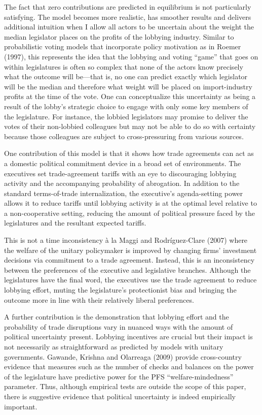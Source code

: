 \documentclass[10pt]{article}
\begin{document}
The fact that zero contributions are predicted in equilibrium is not particularly satisfying. The model becomes more realistic, has smoother results and delivers additional intuition when I allow all actors to be uncertain about the weight the median legislator places on the profits of the lobbying industry. Similar to probabilistic voting models that incorporate policy motivation as in Roemer (1997), this represents the idea that the lobbying and voting ``game'' that goes on within legislatures is often so complex that none of the actors know precisely what the outcome will be---that is, no one can predict exactly which legislator will be the median and therefore what weight will be placed on import-industry profits at the time of the vote. One can conceptualize this uncertainty as being a result of the lobby's strategic choice to engage with only some key members of the legislature. For instance, the lobbied legislators may promise to deliver the votes of their non-lobbied colleagues but may not be able to do so with certainty because those colleagues are subject to cross-pressuring from various sources.

One contribution of this model is that it shows how trade agreements can act as a domestic political commitment device in a broad set of environments. The executives set trade-agreement tariffs with an eye to discouraging lobbying activity and the accompanying probability of abrogation. In addition to the standard terms-of-trade internalization, the executive's agenda-setting power allows it to reduce tariffs until lobbying activity is at the optimal level relative to a non-cooperative setting, reducing the amount of political pressure faced by the legislatures and the resultant expected tariffs.

This is not a time inconsistency \`{a} la Maggi and Rodr\'{i}guez-Clare (2007) where the welfare of the unitary policymaker is improved by changing firms' investment decisions via commitment to a trade agreement. Instead, this is an inconsistency between the preferences of the executive and legislative branches. Although the legislatures have the final word, the executives use the trade agreement to reduce lobbying effort, muting the legislature's protectionist bias and bringing the outcome more in line with their relatively liberal preferences.

A further contribution is the demonstration that lobbying effort and the probability of trade disruptions vary in nuanced ways with the amount of political uncertainty present. Lobbying incentives are crucial but their impact is not necessarily as straightforward as predicted by models with unitary governments. Gawande, Krishna and Olarreaga (2009) provide cross-country evidence that measures such as the number of checks and balances on the power of the legislature have predictive power for the PFS ``welfare-mindedness'' parameter. Thus, although empirical tests are outside the scope of this paper, there is suggestive evidence that political uncertainty is indeed empirically important.
\end{document}
